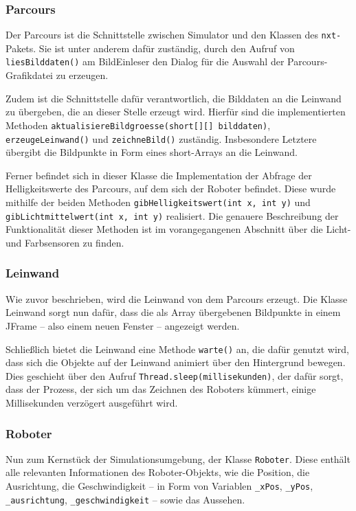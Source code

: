 \documentclass[paper=a4, DIV=calc, BCOR=12mm, twoside=on, onecolumn=on, open = right, titlepage =on, parskip =half-, headsepline = on, footsepline = off, chapterprefix = off, appendixprefix = on, fontsize = 12pt, numbers = noenddot, abstract = on]{scrbook}
\begin{document}
\subsubsection{Parcours}
\label{sec:parcours}
Der Parcours ist die Schnittstelle zwischen Simulator und den Klassen des \texttt{nxt-}Pakets. Sie ist unter anderem dafür zuständig, durch den Aufruf von \texttt{liesBilddaten()} am BildEinleser den Dialog für die Auswahl der Parcours-Grafikdatei zu erzeugen. 

Zudem ist die Schnittstelle dafür verantwortlich, die Bilddaten an die Leinwand zu übergeben, die an dieser Stelle erzeugt wird. Hierfür sind die implementierten Methoden \texttt{aktualisiere\-Bildgroes\-se(short[][] bild\-daten)}, \texttt{er\-zeu\-geLein\-wand()} und \texttt{zeich\-ne\-Bild()} zuständig. Insbesondere Letztere übergibt die Bildpunkte in Form eines short-Arrays an die Leinwand.

Ferner befindet sich in dieser Klasse die Implementation der Abfrage der Helligkeitswerte des Parcours, auf dem sich der Roboter befindet. Diese wurde mithilfe der beiden Methoden \texttt{gib\-Hellig\-keits\-wert(int x, int y)} und \texttt{gib\-Licht\-mittel\-wert(int x, int y)} realisiert. Die genauere Beschreibung der Funktionalität dieser Methoden ist im vorangegangenen Abschnitt über die Licht- und Farbsensoren zu finden.

\subsubsection{Leinwand}
Wie zuvor beschrieben, wird die Leinwand von dem Parcours erzeugt. Die Klasse Leinwand sorgt nun dafür, dass die als Array übergebenen Bildpunkte in einem JFrame -- also einem neuen Fenster -- angezeigt werden.

Schließlich bietet die Leinwand eine Methode \texttt{warte()} an, die dafür genutzt wird, dass sich die Objekte auf der Leinwand animiert über den Hintergrund bewegen. Dies geschieht über den Aufruf \texttt{Thread.sleep(millise\-kun\-den)}, der dafür sorgt, dass der Prozess, der sich um das Zeichnen des Roboters kümmert, einige Millisekunden verzögert ausgeführt wird.

\subsubsection{Roboter}
Nun zum Kernstück der Simulationsumgebung, der Klasse \texttt{Roboter}. Diese enthält alle relevanten Informationen des Roboter-Objekts, wie die Position, die Ausrichtung, die Geschwindigkeit -- in Form von Variablen \texttt{{\_}xPos}, \texttt{{\_}yPos}, \texttt{{\_}aus\-rich\-tung},  \texttt{{\_}ge\-schwin\-dig\-keit} -- sowie das Aussehen. 
\end{document}
